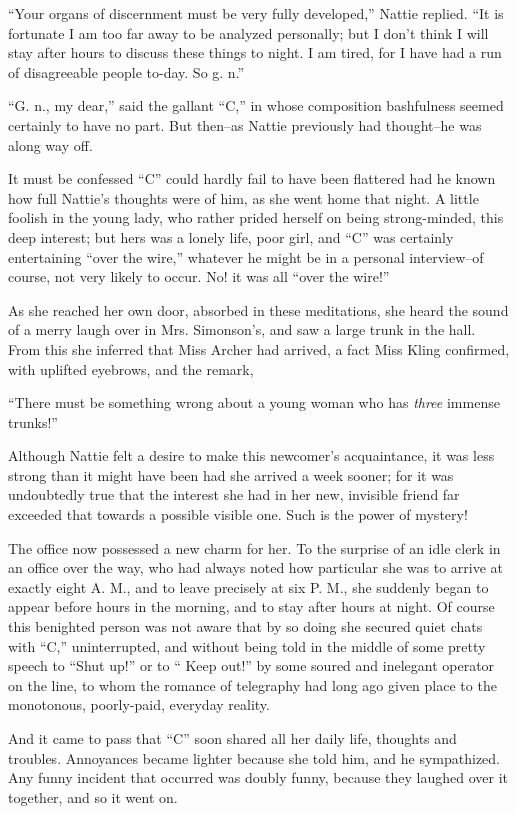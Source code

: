 ``Your organs of discernment must be very fully developed,'' Nattie
replied. ``It is fortunate I am too far away to be analyzed personally;
but I don't think I will stay after hours to discuss these things to
night. I am tired, for I have had a run of disagreeable people to-day.
So g. n.''

``G. n., my dear,'' said the gallant ``C,'' in whose composition bashfulness
seemed certainly to have no part. But then--as Nattie previously had
thought--he was along way off.

It must be confessed ``C'' could hardly fail to have been flattered had he
known how full Nattie's thoughts were of him, as she went home that
night. A little foolish in the young lady, who rather prided herself on
being strong-minded, this deep interest; but hers was a lonely life,
poor girl, and ``C'' was certainly entertaining ``over the wire,'' whatever
he might be in a personal interview--of course, not very likely to
occur. No! it was all ``over the wire!''

As she reached her own door, absorbed in these meditations, she heard
the sound of a merry laugh over in Mrs. Simonson's, and saw a large
trunk in the hall. From this she inferred that Miss Archer had arrived,
a fact Miss Kling confirmed, with uplifted eyebrows, and the remark,

``There must be something wrong about a young woman who has \emph{three} immense
trunks!''

Although Nattie felt a desire to make this newcomer's acquaintance, it
was less strong than it might have been had she arrived a week sooner;
for it was undoubtedly true that the interest she had in her new,
invisible friend far exceeded that towards a possible visible one. Such
is the power of mystery!

The office now possessed a new charm for her. To the surprise of an idle
clerk in an office over the way, who had always noted how particular she
was to arrive at exactly eight A. M., and to leave precisely at six P.
M., she suddenly began to appear before hours in the morning, and to
stay after hours at night. Of course this benighted person was not aware
that by so doing she secured quiet chats with ``C,'' uninterrupted, and
without being told in the middle of some pretty speech to ``Shut up!''
or to `` Keep out!'' by some soured and inelegant operator on the line, to
whom the romance of telegraphy had long ago given place to the
monotonous, poorly-paid, everyday reality.

And it came to pass that ``C'' soon shared all her daily life, thoughts
and troubles. Annoyances became lighter because she told him, and he
sympathized. Any funny incident that occurred was doubly funny, because
they laughed over it together, and so it went on.

